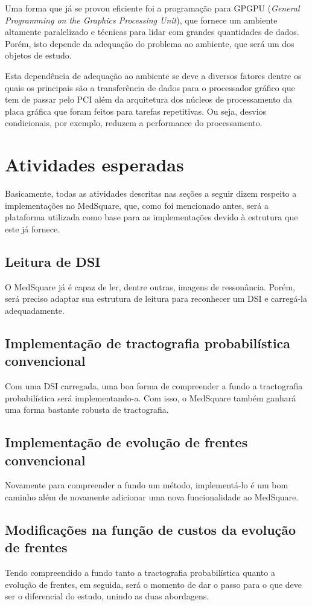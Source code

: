\documentclass[a4paper,11pt]{report}
\begin{document}
  Uma forma que já se provou eficiente foi a programação para GPGPU (\textit{General Programming on the Graphics Processing Unit}), que fornece um ambiente altamente paralelizado e técnicas para lidar com grandes quantidades de dados. Porém, isto depende da adequação do problema ao ambiente, que será um dos objetos de estudo.
  
  Esta dependência de adequação ao ambiente se deve a diversos fatores dentre os quais os principais são a transferência de dados para o processador gráfico que tem de passar pelo PCI além da arquitetura dos núcleos de processamento da placa gráfica que foram feitos para tarefas repetitivas. Ou seja, desvios condicionais, por exemplo, reduzem a performance do processamento.

\chapter{Atividades esperadas}
  Basicamente, todas as atividades descritas nas seções a seguir dizem respeito a implementações no MedSquare, que, como foi mencionado antes, será a plataforma utilizada como base para as implementações devido à estrutura que este já fornece.

  \section{Leitura de DSI}
  O MedSquare já é capaz de ler, dentre outras, imagens de ressonância. Porém, será preciso adaptar sua estrutura de leitura para reconhecer um DSI e carregá-la adequadamente.
  
  \section{Implementação de tractografia probabilística convencional}
  Com uma DSI carregada, uma boa forma de compreender a fundo a tractografia probabilística será implementando-a. Com isso, o MedSquare também ganhará uma forma bastante robusta de tractografia.
  
  \section{Implementação de evolução de frentes convencional}
  Novamente para compreender a fundo um método, implementá-lo é um bom caminho além de novamente adicionar uma nova funcionalidade ao MedSquare.

  \section{Modificações na função de custos da evolução de frentes}
  Tendo compreendido a fundo tanto a tractografia probabilística quanto a evolução de frentes, em seguida, será o momento de dar o passo para o que deve ser o diferencial do estudo, unindo as duas abordagens.
\end{document}
